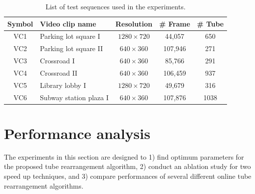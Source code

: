 \documentclass[11pt]{hyu_thesis}
\begin{document}
\begin{table}
	\begin{center}
		\begin{tabular}{clccc}
			\hline
			\hline
			Symbol & Video clip name & Resolution & \# Frame & \# Tube\\
			\hline
			\hline
			VC1 & Parking lot square I & $1280 \times 720$ & 44,057 & 650\\
			\hline
			VC2 & Parking lot square II & $640 \times 360$ & 107,946 & 271\\
			\hline
			VC3 & Crossroad I & $640 \times 360$ & 85,766 & 291\\
			\hline
			VC4 & Crossroad II & $640 \times 360$ & 106,459 & 937\\
			\hline
			VC5 & Library lobby I & $1280 \times 720$ & 49,679 & 316\\
			\hline
			VC6 & Subway station plaza I & $640 \times 360$ & 107,876 & 1038\\
			\hline
		\end{tabular}
	\end{center}
	\caption{List of test sequences used in the experiments.}
	\label{tb:video_perf}
\end{table}

\section{Performance analysis}
The experiments in this section are designed to 1) find optimum parameters for the proposed tube rearrangement algorithm, 2) conduct an ablation study for two speed up techniques, and 3) compare performances of several different online tube rearrangement algorithms.
\end{document}
